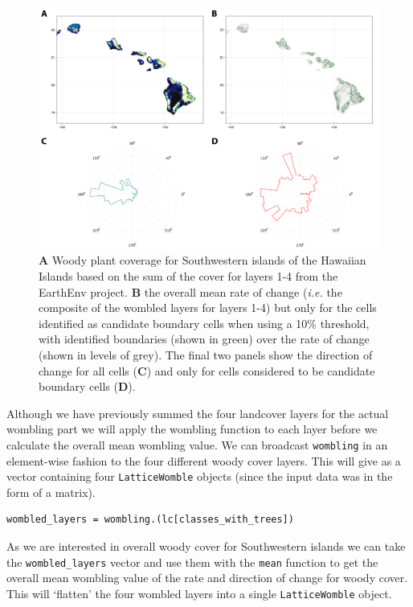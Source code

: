 \begin{figure}[h]
    \centering
    \includegraphics[width=\textwidth]{figures/fig_eg.png}
    \caption{\textbf{A} Woody plant coverage for Southwestern islands of the
Hawaiian Islands based on the sum of the cover for layers 1-4 from the
EarthEnv project. \textbf{B} the overall mean rate of change
(\emph{i.e.} the composite of the wombled layers for layers 1-4) but
only for the cells identified as candidate boundary cells when using a
10\% threshold, with identified boundaries (shown in green) over the
rate of change (shown in levels of grey). The final two panels show the
direction of change for all cells (\textbf{C}) and only for cells
considered to be candidate boundary cells
(\textbf{D}).}
    \label{fig:example}
\end{figure}

Although we have previously summed the four landcover layers for the
actual wombling part we will apply the wombling function to each layer
before we calculate the overall mean wombling value. We can broadcast
\texttt{wombling} in an element-wise fashion to the four different woody
cover layers. This will give as a vector containing four
\texttt{LatticeWomble} objects (since the input data was in the form of
a matrix).

\begin{verbatim}
wombled_layers = wombling.(lc[classes_with_trees])
\end{verbatim}

As we are interested in overall woody cover for Southwestern islands we
can take the \texttt{wombled\_layers} vector and use them with the
\texttt{mean} function to get the overall mean wombling value of the
rate and direction of change for woody cover. This will `flatten' the
four wombled layers into a single \texttt{LatticeWomble} object.

